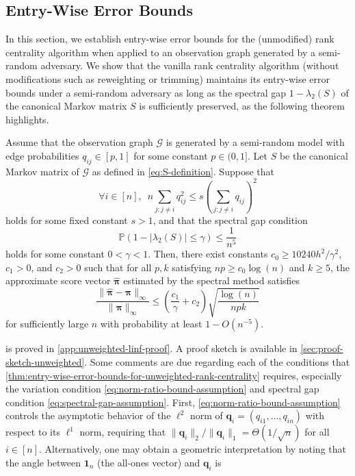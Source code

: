 \documentclass[sigconf,nonacm,pbalance]{acmart}
\begin{document}
\subsection{Entry-Wise Error Bounds}
In this section, we establish entry-wise error bounds for the (unmodified) rank centrality algorithm when applied to an observation graph generated by a semi-random adversary. We show that the vanilla rank centrality algorithm (without modifications such as reweighting or trimming) maintains its entry-wise error bounds under a semi-random adversary as long as the spectral gap $1 - \lambda_2(S)$ of the canonical Markov matrix $S$ is sufficiently preserved, as the following theorem highlights.
\begin{theorem}\label{thm:entry-wise-error-bounds-for-unweighted-rank-centrality}
Assume that the observation graph $\mathcal{G}$ is generated by a semi-random model with edge probabilities $q_{ij} \in [p, 1]$ for some constant $p \in (0, 1]$.
Let $S$ be the canonical Markov matrix of $\mathcal{G}$ as defined in \cref{eq:S-definition}.
Suppose that 
\begin{equation}
\forall i \in [n],\enspace n\sum_{j: j\neq i} q_{ij}^2 \leq s \left(\sum_{j:j\neq i} q_{ij}\right)^2 \label{eq:norm-ratio-bound-assumption}
\end{equation}
holds for some fixed constant $s > 1$, and that the spectral gap condition
\begin{equation}
    \mathbb{P}(1-|\lambda_2(S)|\leq \gamma) \leq \frac{1}{n^5} \label{eq:spectral-gap-assumption}
\end{equation}
holds for some constant $0<\gamma<1$.
Then, there exist constants $c_0\geq 10240h^2/\gamma^2$,
$c_1 > 0$, and $c_2>0$ such that for all $p,k$ satisfying $np \geq c_0 \log(n)$ and $k \geq 5$, the approximate score vector $\hat{\bm{\pi}}$ estimated by the spectral method satisfies
\begin{equation}
    \frac{\|\hat{\bm{\pi}}-\bm{\pi}\|_\infty}{\|\bm{\pi}\|_\infty} \leq \left(\frac{c_1}{\gamma}+c_2\right) \sqrt{\frac{\log(n)}{npk}} 
\end{equation}
for sufficiently large $n$ with probability at least $1-O(n^{-5})$.
\end{theorem}
 is proved in \cref{app:unweighted-linf-proof}. A proof sketch is available in \cref{sec:proof-sketch-unweighted}. Some comments are due regarding each of the conditions that \cref{thm:entry-wise-error-bounds-for-unweighted-rank-centrality} requires, especially the variation condition \cref{eq:norm-ratio-bound-assumption} and spectral gap condition \cref{eq:spectral-gap-assumption}. First, \cref{eq:norm-ratio-bound-assumption} controls the asymptotic behavior of the $\ell^2$ norm of $\bm{q}_i=(q_{i1},\dots,q_{in})$ with respect to its $\ell^1$ norm, requiring that $\|\bm{q}_i\|_2/\|\bm{q}_i\|_1 = \Theta(1/\sqrt{n})$ for all $i\in[n]$. Alternatively, one may obtain a geometric interpretation by noting that the angle between $\bm{1}_n$ (the all-ones vector) and $\bm{q}_i$ is
\end{document}
